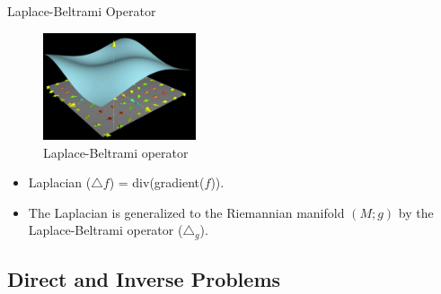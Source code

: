 \documentclass{beamer}
\begin{document}
\begin{frame}{Laplace-Beltrami Operator}


\begin{figure}
    \centering
    \includegraphics[width=0.4\textwidth]{laplacian.png}
    \caption{Laplace-Beltrami operator}
    \label{fig:laplacian}
\end{figure}

\begin{itemize}
  \item Laplacian ($ {\triangle} f $) = div(gradient($f$)).
  \item The Laplacian is generalized to the Riemannian manifold $ (M;g) $ by the Laplace-Beltrami operator ($ {\triangle}_g $).
\end{itemize}

\end{frame}

\subsection{Direct and Inverse Problems}
\end{document}
